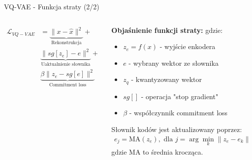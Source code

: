 \documentclass{beamer}
\begin{document}
\begin{frame}{VQ-VAE - Funkcja straty (2/2)}
  \begin{columns}
    \begin{column}{0.5\textwidth}
      \begin{tcolorbox}[colback=yellow!10!white, colframe=black!60, boxrule=0.5pt, arc=3mm]
        \begin{align*}
          \mathcal{L}_{VQ-VAE} &= \underbrace{\|x - \hat{x}\|^2}_{\text{Rekonstrukcja}} + \\
          &\underbrace{\|sg[z_e] - e\|^2}_{\text{Uaktualnienie słownika}} + \\
          &\underbrace{\beta \|z_e - sg[e]\|^2}_{\text{Commitment loss}}
        \end{align*}
      \end{tcolorbox}
    \end{column}
    \begin{column}{0.5\textwidth}
      \textbf{Objaśnienie funkcji straty:}
      \medskip
      gdzie:
      \begin{itemize}
        \item $z_e = f(x)$ - wyjście enkodera
        \item $e$ - wybrany wektor ze słownika
        \item $z_q$ - kwantyzowany wektor
        \item $sg[]$ - operacja "stop gradient"
        \item $\beta$ - współczynnik commitment loss
      \end{itemize}
      
      Słownik kodów jest aktualizowany poprzez:
      \begin{align*}
        e_j = \text{MA}(z_e), \text{ dla } j = \arg\min_k \|z_e - e_k\|
      \end{align*}
      gdzie MA to średnia krocząca.
    \end{column}
  \end{columns}
\end{frame}
\end{document}
